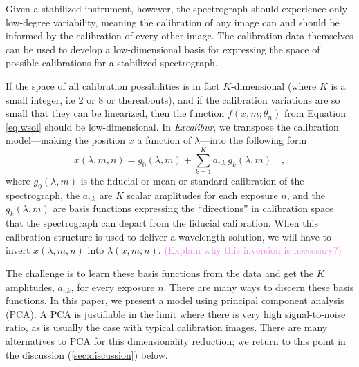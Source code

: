 \documentclass[modern]{aastex63}
\newcommand{\project}[1]{\textsl{#1}}
\newcommand{\name}{\project{Excalibur}}
\newcommand{\mb}[1]{\textcolor{violet}{#1}}
\begin{document}
Given a stabilized instrument, however, the spectrograph should experience only low-degree variability, meaning the calibration of any image can and should be informed by the calibration of every other image.  The calibration data themselves can be used to develop a low-dimensional basis for expressing the space of possible calibrations for a stabilized spectrograph.

If the space of all calibration possibilities is in fact $K$-dimensional (where $K$ is a small integer, i.e 2 or 8 or thereabouts), and if the calibration variations are so small that they can be linearized, then the function $f(x,m;\theta_{n})$ from Equation \ref{eq:wsol} should be low-dimensional.  In \name, we transpose the calibration model---making the position $x$ a function of $\lambda$---into the following form
\begin{equation}
x(\lambda,m,n) = g_0(\lambda,m) + \sum_{k=1}^K a_{nk}\,g_k(\lambda,m)
\quad ,
\label{eq:excl_wsol}
\end{equation}
where
$g_0(\lambda,m)$ is the fiducial or mean or standard calibration of the spectrograph,
the $a_{nk}$ are $K$ scalar amplitudes for each exposure $n$,
and the $g_k(\lambda,m)$ are basis functions expressing the ``directions'' in calibration space that the spectrograph can depart from the fiducial calibration.  When this calibration structure is used to deliver a wavelength solution, we will have to invert $x(\lambda,m,n)$ into $\lambda(x,m,n)$.  \mb{(Explain why this inversion is necessary?)}

The challenge is to learn these basis functions from the data and get the $K$ amplitudes, $a_{nk}$, for every exposure $n$.  There are many ways to discern these basis functions.  In this paper, we present a model using principal component analysis (PCA).  A PCA is justifiable in the limit where there is very high signal-to-noise ratio, as is usually the case with typical calibration images.  There are many alternatives to PCA for this dimensionality reduction; we return to this point in the discussion (\textsection \ref{sec:discussion}) below.
\end{document}
